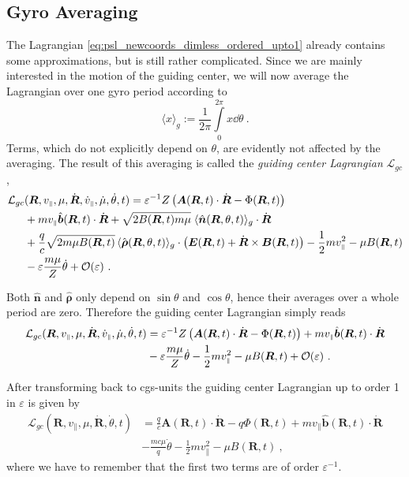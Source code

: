 \documentclass{scrartcl}
\renewcommand{\vec}[1]{\boldsymbol{#1}}
\newcommand{\uv}[1]{\hat{\vec{#1}}}
\newcommand{\rvgc}{\vec{R}} %
\newcommand{\PSL}{\mathcal{L}}
\newcommand{\subparallel}{{\scriptscriptstyle\parallel}}
\begin{document}
\subsection{Gyro Averaging}
The Lagrangian \eqref{eq:psl_newcoords_dimless_ordered_upto1} already contains some approximations, but is still rather complicated. Since we are mainly interested in the motion of the guiding center, we will now average the Lagrangian over one gyro period according to
\begin{equation*}
    \langle x \rangle_g := \frac{1}{2\pi} \int\limits_0^{2\pi} x \dd{\theta} \ .
\end{equation*}
Terms, which do not explicitly depend on $\theta$, are evidently not affected by the averaging. The result of this averaging is called the \emph{guiding center Lagrangian} $\PSL_{gc}$,
\begin{align*}
\PSL_{gc}&(\rvgc,v_\subparallel,\mu,\dot{\rvgc},\dot{v}_\subparallel,\dot{\mu},\dot{\theta},t)  = \varepsilon^{-1}Z\left(\vec{A}(\rvgc,t)\cdot\dot{\rvgc} - \Phi(\rvgc,t)\right) \nonumber\\
& + mv_\subparallel \uv{b}(\rvgc,t)\cdot\dot{\rvgc} + \sqrt{2B(\rvgc,t)m\mu}\;\langle\uv{n}(\rvgc,\theta,t)\rangle_g\cdot\dot{\rvgc}  \nonumber\\
& + \frac{q}{c}\sqrt{2m\mu B(\rvgc,t)}\,\langle\uv{\rho}(\rvgc,\theta,t)\rangle_g\cdot\left(\vec{E}(\rvgc,t) + \dot{\rvgc}\times\vec{B}(\rvgc,t)\right) - \frac12mv_\subparallel^2 - \mu B(\rvgc,t) \nonumber\\
& - \varepsilon \frac{m\mu}{Z}\dot{\theta} +\order{\varepsilon}  \ .
\end{align*}

Both $\uv{n}$ and $\uv{\rho}$ only depend on $\sin\theta$ and $\cos\theta$, hence their averages over a whole period are zero. Therefore the guiding center Lagrangian simply reads
\begin{align*}
\PSL_{gc}(\rvgc,v_\subparallel,\mu,\dot{\rvgc},\dot{v}_\subparallel,\dot{\mu},\dot{\theta},t)  &= \varepsilon^{-1}Z\left(\vec{A}(\rvgc,t)\cdot\dot{\rvgc} - \Phi(\rvgc,t)\right) + mv_\subparallel \uv{b}(\rvgc,t)\cdot\dot{\rvgc} \nonumber\\
&  - \varepsilon \frac{m\mu}{Z}\dot{\theta} - \frac12mv_\subparallel^2 - \mu B(\rvgc,t)  +\order{\varepsilon} \ .
\end{align*}


After transforming back to cgs-units the guiding center Lagrangian up to order 1 in $\varepsilon$ is given by
\begin{align}
    \PSL_{gc}(\rvgc,v_\subparallel,\mu,\dot{\rvgc},\dot{\theta},t)  &= \frac{q}{c}\vec{A}(\rvgc,t)\cdot\dot{\rvgc} - q\Phi(\rvgc,t) + mv_\subparallel \uv{b}(\rvgc,t)\cdot\dot{\rvgc} \nonumber\\
&  - \frac{mc\mu}{q}\dot{\theta} - \frac12mv_\subparallel^2 - \mu B(\rvgc,t)  \ , \label{eq:psl_gc_newcoords_dimless_ordered_averaged_upto1_cgs}
\end{align}
where we have to remember that the first two terms are of order $\varepsilon^{-1}$.
\end{document}
